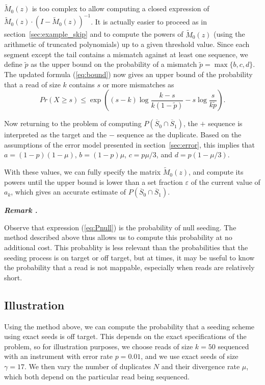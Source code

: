 \documentclass{article}
\newcounter{remarkcounter}
\newenvironment{remark}
{\small\it\vspace{0.5\baselineskip}
  \refstepcounter{remarkcounter}%
  \noindent\textbf{Remark \arabic{remarkcounter}.}%
}{\vspace{0.5\baselineskip}}
\begin{document}
$\tilde{M}_0(z)$ is too complex to allow computing a closed expression of
$\tilde{M}_0(z)\cdot(I-\tilde{M}_0(z))^{-1}$. It is actually easier to
proceed as in section~\ref{sec:example_skip} and to compute the powers of
$\tilde{M}_0(z)$ (using the arithmetic of truncated polynomials) up to a
given threshold value. Since each segment except the tail contains a
mismatch against at least one sequence, we define $\tilde{p}$ as the upper
bound on the probability of a mismatch $\tilde{p} = \max\{b,c,d\}$. The
updated formula (\ref{eq:bound}) now gives an upper bound of the
probability that a read of size $k$ contains $s$ or more mismatches as
\begin{equation*}
Pr(X \geq s) \leq \exp \left( (s-k)\log \frac{k-s}{k(1-\tilde{p})} -s\log
\frac{s}{k\tilde{p}} \right).
\end{equation*}

Now returning to the problem of computing $P(\overline{S}_0 \cap
\overline{S}_1)$, the $+$ sequence is interpreted as the target and the
$-$ sequence as the duplicate. Based on the assumptions of the error model
presented in section~\ref{sec:error}, this implies that $a =
(1-p)(1-\mu)$, $b = (1-p)\mu$, $c = p\mu/3$, and $d = p(1-\mu/3)$.

With these values, we can fully specify the matrix $\tilde{M}_0(z)$, and
compute its powers until the upper bound is lower than a set fraction
$\varepsilon$ of the current value of $a_k$, which gives an accurate
estimate of $P(\overline{S}_0 \cap \overline{S}_1)$.


\begin{remark}
Observe that expression (\ref{eq:Pnull}) is the probability of null
seeding. The method described above thus allows us to compute this
probability at no additional cost. This probablity is less relevant than
the probabilities that the seeding process is on target or off target, but
at times, it may be useful to know the probability that a read is
not mappable, especially when reads are relatively short.
\end{remark}


\subsection{Illustration}
\label{sec:illdual}

Using the method above, we can compute the probability that a seeding
scheme using exact seeds is off target. This depends on the exact
specifications of the problem, so for illustration purposes, we choose
reads of size $k=50$ sequenced with an instrument with error rate
$p=0.01$, and we use exact seeds of size $\gamma=17$. We then vary the
number of duplicates $N$ and their divergence rate $\mu$, which both
depend on the particular read being sequenced.
\end{document}
